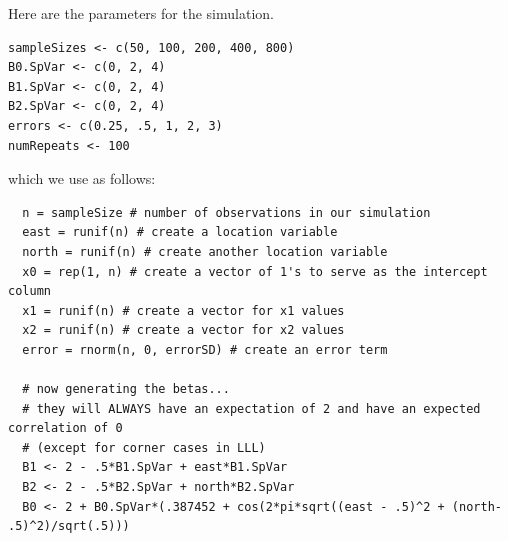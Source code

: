 \documentclass{article}\usepackage[]{graphicx}\usepackage[]{color}
\begin{document}
% 
% 
% 
% 
% 
% 




Here are the parameters for the simulation.
\begin{verbatim}
sampleSizes <- c(50, 100, 200, 400, 800) 
B0.SpVar <- c(0, 2, 4)  
B1.SpVar <- c(0, 2, 4) 
B2.SpVar <- c(0, 2, 4) 
errors <- c(0.25, .5, 1, 2, 3)
numRepeats <- 100
\end{verbatim}

which we use as follows:

\begin{verbatim}
  n = sampleSize # number of observations in our simulation
  east = runif(n) # create a location variable
  north = runif(n) # create another location variable
  x0 = rep(1, n) # create a vector of 1's to serve as the intercept column
  x1 = runif(n) # create a vector for x1 values
  x2 = runif(n) # create a vector for x2 values
  error = rnorm(n, 0, errorSD) # create an error term
  
  # now generating the betas...
  # they will ALWAYS have an expectation of 2 and have an expected correlation of 0 
  # (except for corner cases in LLL)  
  B1 <- 2 - .5*B1.SpVar + east*B1.SpVar
  B2 <- 2 - .5*B2.SpVar + north*B2.SpVar
  B0 <- 2 + B0.SpVar*(.387452 + cos(2*pi*sqrt((east - .5)^2 + (north- .5)^2)/sqrt(.5)))
\end{verbatim}
\end{document}
